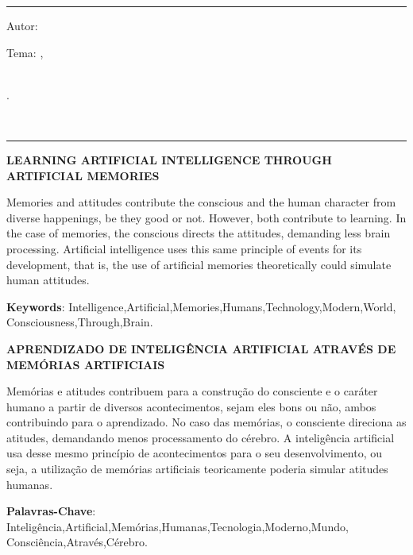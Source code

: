 

\hrule	%
\begin{center} %
\begin{minipage}[c]{12.5cm} %
Autor: \imprimirautor

Tema: \imprimirtitulo 
\imprimirlocal,\\ 
\imprimirorientador\\
\hspace{0.5cm}
\parbox[t]{\textwidth}{\imprimirinstituicao
\imprimirdata.}\\
\hspace{0.5cm}
\end{minipage}
\end{center}
\hrule

\vspace{1cm}

\SingleSpacing
\noindent
{\textbf{LEARNING ARTIFICIAL INTELLIGENCE THROUGH ARTIFICIAL MEMORIES}}
\indent
\small

Memories and attitudes contribute the conscious and the human character from diverse happenings, be they good or not. However, both contribute to learning. In the case of memories, the conscious directs the attitudes, demanding less brain processing. Artificial intelligence uses this same principle of events for its development, that is, the use of artificial memories theoretically could simulate human attitudes.

\noindent
 
\textbf{Keywords}: Intelligence,Artificial,Memories,Humans,Technology,Modern,World,
\\Consciousness,Through,Brain.

\SingleSpacing
\noindent
{\textbf{APRENDIZADO DE INTELIGÊNCIA ARTIFICIAL ATRAVÉS DE MEMÓRIAS ARTIFICIAIS}}
\indent
\small

Memórias e atitudes contribuem para a construção do consciente e o caráter humano a partir de diversos acontecimentos, sejam eles bons ou não, ambos contribuindo para o aprendizado. No caso das memórias, o consciente direciona as atitudes, demandando menos processamento do cérebro. A inteligência artificial usa desse mesmo princípio de acontecimentos para o seu desenvolvimento, ou seja, a utilização de memórias artificiais teoricamente poderia simular atitudes humanas.

\noindent
 
\textbf{Palavras-Chave}: Inteligência,Artificial,Memórias,Humanas,Tecnologia,Moderno,Mundo,
\\Consciência,Através,Cérebro.

